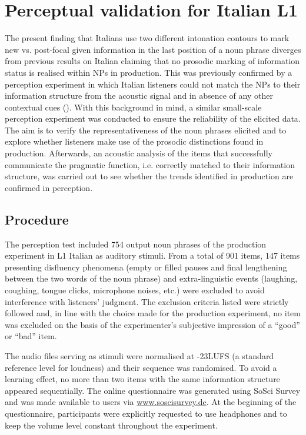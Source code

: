 \section{Perceptual validation for Italian L1}
\label{sec:2.4}
The present finding that Italians use two different intonation contours to mark new vs. post-focal given information in the last position of a noun phrase diverges from previous results on Italian claiming that no prosodic marking of information status is realised within NPs in production. This was previously confirmed by a perception experiment in which Italian listeners could not match the NPs to their information structure from the acoustic signal and in absence of any other contextual cues (\citealt{KrahmerSwerts2008}). With this background in mind, a similar small-scale perception experiment was conducted to ensure the reliability of the elicited data. The aim is to verify the representativeness of the noun phrases elicited and to explore whether listeners make use of the prosodic distinctions found in production. Afterwards, an acoustic analysis of the items that successfully communicate the pragmatic function, i.e. correctly matched to their information structure, was carried out to see whether the trends identified in production are confirmed in perception.

\subsection{Procedure}
\label{sec:2.4.1}
The perception test included 754 output noun phrases of the production experiment in L1 Italian as auditory stimuli. From a total of 901 items, 147 items presenting disfluency phenomena (empty or filled pauses and final lengthening between the two words of the noun phrase) and extra-linguistic events (laughing, coughing, tongue clicks, microphone noises, etc.) were excluded to avoid interference with listeners’ judgment. The exclusion criteria listed were strictly followed and, in line with the choice made for the production experiment, no item was excluded on the basis of the experimenter’s subjective impression of a “good” or “bad” item.

The audio files serving as stimuli were normalised at -23LUFS (a standard reference level for loudness) and their sequence was randomised. To avoid a learning effect, no more than two items with the same information structure appeared sequentially. The online questionnaire was generated using SoSci Survey \citep{Leiner2019} and was made available to users via \url{www.soscisurvey.de}. At the beginning of the questionnaire, participants were explicitly requested to use headphones and to keep the volume level constant throughout the experiment.

